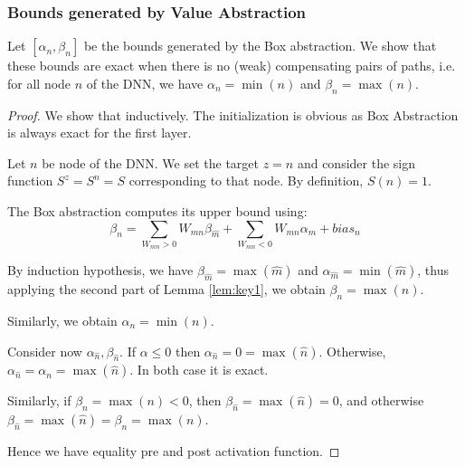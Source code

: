 \iffalse
	As direct corollary of Lemma \ref{lem:key1}, we obtain:
	
	\begin{corollary}
		\label{cor1}
		$$\max(c)=\sum_{b \in L, W_{bc}>0}W_{bc} \max(\hat{b}) + \sum_{b \in L, W_{bc}<0}W_{bc} \min(\hat{b}) + bias_c$$
		$$\min(c)=\sum_{b \in L, W_{bc}>0}W_{bc} \min(\hat{b}) + \sum_{b \in L, W_{bc}<0}W_{bc} \max(\hat{b}) + bias_c$$
	\end{corollary}
	
\fi
	
	
	
	
	
	
	\subsubsection*{Bounds generated by Value Abstraction}

	\smallskip
	
	Let $[\alpha_n,\beta_n]$ be the bounds generated by the Box abstraction.
	We show that these bounds are exact when there is no (weak) compensating pairs of paths, i.e. for all node $n$ of the DNN, we have $\alpha_n=\min(n)$ and $\beta_n=\max(n)$.

\begin{proof}
	 We show that inductively. The initialization is obvious as Box Abstraction is always exact for the first layer.

	Let $n$ be node of the DNN. We set the target $z=n$ and consider the sign function $S^z=S^n=S$ corresponding to that node. By definition, $S(n)=1$. 
	
	The Box abstraction computes its upper bound using:
	$$\beta_n= \sum_{W_{mn}>0} W_{mn} \beta_{\hat{m}} + \sum_{W_{mn}<0} W_{mn} \alpha_{\hat{m}} + bias_n$$

	By induction hypothesis, we have 
		$\beta_{\hat{m}}=\max(\hat{m})$ and
		$\alpha_{\hat{m}}=\min(\hat{m})$, thus 
		applying the second part of Lemma \ref{lem:key1}, we obtain
		$\beta_n=\max(n)$.
		
		Similarly, we obtain $\alpha_n=\min(n)$.
		
		Consider now $\alpha_{\hat{n}},\beta_{\hat{n}}$.
		If $\alpha \leq 0$ then $\alpha_{\hat{n}}=0=\max(\hat{n})$.
		Otherwise, $\alpha_{\hat{n}}=\alpha_n=\max(\hat{n})$.
		In both case it is exact.

		Similarly, if $\beta_n=\max(n)<0$, 
		then $\beta_{\hat{n}}=\max(\hat{n})=0$, 
		and otherwise 
		$\beta_{\hat{n}}=\max(\hat{n})=\beta_n=\max(n)$.
		
		Hence we have equality pre and post activation function.
			\end{proof}
	


